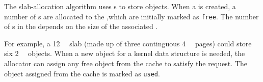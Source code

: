 The slab-allocation algorithm uses s to store  objects.
When a  is created, a number of s are allocated to the ,which are initially marked as \texttt{free}.
The number of s in the  depends on the size of the associated .

For example, a \SI{12}{\kibi{} \byte{}} slab (made up of three continguous \SI{4}{\kibi{} \byte{}} pages) could store six \SI{2}{\kibi{} \byte{}} objects.
When a new object for a kernel data structure is needed, the allocator can assign any free object from the cache to satisfy the request.
The object assigned from the cache is marked as \texttt{used}.



